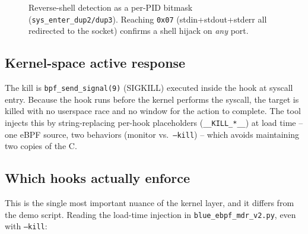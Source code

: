 \documentclass[11pt]{article}
\newcommand{\co}[1]{\texttt{#1}}
\begin{document}
\begin{figure}[ht]
\centering
{}
\caption{Reverse-shell detection as a per-PID bitmask
(\texttt{sys\_enter\_dup2/dup3}). Reaching \texttt{0x07}
(stdin+stdout+stderr all redirected to the socket) confirms a shell hijack on
\emph{any} port.}
\label{fig:dup2}
\end{figure}

\subsection{Kernel-space active response}
The kill is \co{bpf\_send\_signal(9)} (SIGKILL) executed inside the hook at
syscall entry. Because the hook runs before the kernel performs the syscall,
the target is killed with no userspace race and no window for the action to
complete. The tool injects this by string-replacing per-hook placeholders
(\co{\_\_KILL\_*\_\_}) at load time -- one eBPF source, two behaviors
(monitor vs.\ \co{--kill}) -- which avoids maintaining two copies of the C.

\subsection{Which hooks actually enforce}
\label{sec:connectkill}
This is the single most important nuance of the kernel layer, and it differs
from the demo script. Reading the load-time injection in
\co{blue\_ebpf\_mdr\_v2.py}, even with \co{--kill}:
\end{document}
